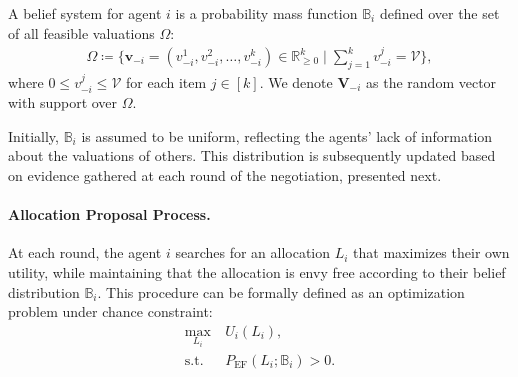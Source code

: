 \begin{definition}
A belief system for agent $i$ is a probability mass function $\mathbb{B}_i$ defined over the set of all feasible valuations $\Omega$:
\begin{align*}
\Omega \coloneq \big\{\mathbf{v}_{-i} = (v_{-i}^1, v_{-i}^2,\dots, v_{-i}^k)\in\mathbb{R}_{\geq 0}^k\mid \sum\limits_{j=1}^k v_{-i}^j = \mathcal{V}\big\},
\end{align*}
where $0\leq v_{-i}^j\leq \mathcal{V}$ for each item $j \in [k]$. We denote $\mathbf{V}_{-i}$ as the random vector with support over $\Omega$.
\end{definition}

Initially, $\mathbb{B}_i$ is assumed to be uniform, reflecting the agents’ lack of information about the valuations of others. This distribution is subsequently updated based on evidence gathered at each round of the negotiation, presented next.

\paragraph{Allocation Proposal Process.} At each round, the agent $i$ searches for an allocation $L_i$ that maximizes their own utility, while maintaining that the allocation is envy free according to their belief distribution $\mathbb{B}_i$. This procedure can be formally defined as an optimization problem under chance constraint:
\begin{align}
\label{defn:opt}
\max_{L_i} \ & U_i(L_i), \nonumber \\
\text{s.t.} \ & P_{\text{EF}}(L_i; \mathbb{B}_i) > 0. 
\end{align}

